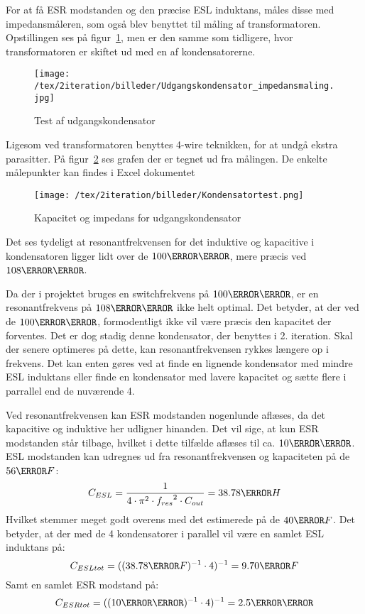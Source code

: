 For at få ESR modstanden og den præcise ESL induktans, måles disse med impedansmåleren, som også blev benyttet til måling af transformatoren. Opstillingen ses på figur~\ref{fig: cap}, men er den samme som tidligere, hvor transformatoren er skiftet ud med en af kondensatorerne. 
\begin{figure}[H]
	\center
	\texttt{[image: /tex/2iteration/billeder/Udgangskondensator\_impedansmaling.jpg]}
	\caption{Test af udgangskondensator}
	\label{fig: cap}
\end{figure}
Ligesom ved transformatoren benyttes 4-wire teknikken, for at undgå ekstra parasitter. På figur~\ref{fig: captest} ses grafen der er tegnet ud fra målingen. De enkelte målepunkter kan findes i Excel dokumentet \cite{Kondensator_impedans.xlsx}
\begin{figure}[H]
	\center
	\texttt{[image: /tex/2iteration/billeder/Kondensatortest.png]}
	\caption{Kapacitet og impedans for udgangskondensator}
	\label{fig: captest}
\end{figure}
Det ses tydeligt at resonantfrekvensen for det induktive og kapacitive i kondensatoren ligger lidt over de $100\kilo \hertz$, mere præcis ved $108\kilo \hertz$. 


\noindent Da der i projektet bruges en switchfrekvens på $100\kilo \hertz$, er en resonantfrekvens på $108\kilo \hertz$ ikke helt optimal. Det betyder, at der ved de $100\kilo \hertz$, formodentligt ikke vil være præcis den kapacitet der forventes. Det er dog stadig denne kondensator, der benyttes i 2. iteration. Skal der senere optimeres på dette, kan resonantfrekvensen rykkes længere op i frekvens. Det kan enten gøres ved at finde en lignende kondensator med mindre ESL induktans eller finde en kondensator med lavere kapacitet og sætte flere i parrallel end de nuværende 4.


\noindent Ved resonantfrekvensen kan ESR modstanden nogenlunde aflæses, da det kapacitive og induktive her udligner hinanden. Det vil sige, at kun ESR modstanden står tilbage, hvilket i dette tilfælde aflæses til ca. $10\milli \ohm$. 
ESL modstanden kan udregnes ud fra resonantfrekvensen og kapaciteten på de $56\micro F$:
\begin{equation} \label{CESL}
C_{ESL} = \frac{1}{4 \cdot \pi^{2} \cdot {f_{res}}^{2} \cdot C_{out}} = 38.78\nano H
\end{equation}
Hvilket stemmer meget godt overens med det estimerede på de $40\nano F$.
Det betyder, at der med de 4 kondensatorer i parallel vil være en samlet ESL induktans på: 
\begin{equation} \label{CESLtot}
C_{ESLtot} = ((38.78\nano F)^{-1} \cdot 4)^{-1} = 9.70\nano F
\end{equation}
Samt en samlet ESR modstand på:
\begin{equation} \label{CSRtot}
C_{ESRtot} = ((10\milli \ohm)^{-1} \cdot 4)^{-1} = 2.5\milli \ohm
\end{equation}

